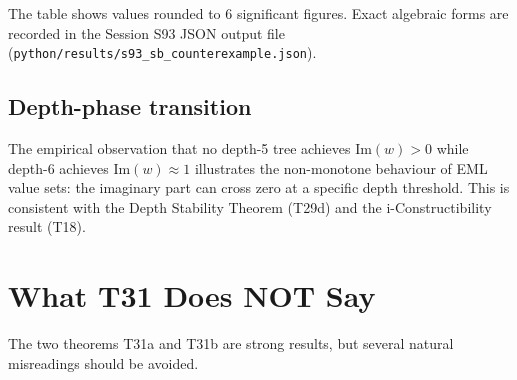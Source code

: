 \documentclass[11pt]{article}
\begin{document}
\noindent
The table shows values rounded to 6 significant figures.  Exact algebraic forms
are recorded in the Session S93 JSON output file
(\texttt{python/results/s93\_sb\_counterexample.json}).

\subsection*{Depth-phase transition}

The empirical observation that no depth-5 tree achieves $\mathrm{Im}(w) > 0$
while depth-6 achieves $\mathrm{Im}(w) \approx 1$ illustrates the non-monotone
behaviour of EML value sets: the imaginary part can cross zero at a specific depth
threshold.  This is consistent with the Depth Stability Theorem (T29d) and the
i-Constructibility result (T18).

\section{What T31 Does NOT Say}

The two theorems T31a and T31b are strong results, but several natural
misreadings should be avoided.
\end{document}
